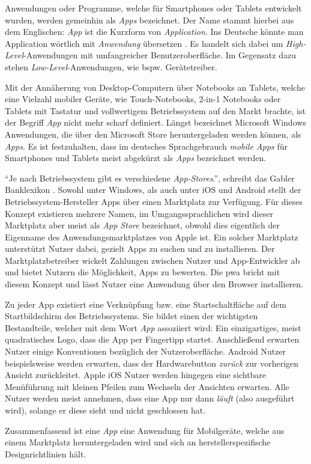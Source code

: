 Anwendungen oder Programme, welche für Smartphones oder Tablets entwickelt wurden, werden gemeinhin als \textit{Apps} bezeichnet. Der Name stammt hierbei aus dem Englischen: \textit{App} ist die Kurzform von \textit{Application}. Ins Deutsche könnte man Application wörtlich mit \textit{Anwendung} übersetzen \cite{BegriffApp}. Es handelt sich dabei um \textit{High-Level}-Anwendungen mit umfangreicher Benutzeroberfläche. Im Gegensatz dazu stehen \textit{Low-Level}-Anwendungen, wie bspw. Gerätetreiber.

Mit der Annäherung von Desktop-Computern über Notebooks an Tablets, welche eine Vielzahl mobiler Geräte, wie Touch-Notebooks, 2-in-1 Notebooks oder Tablets mit Tastatur und vollwertigem Betriebssystem auf den Markt brachte, ist der Begriff \textit{App} nicht mehr scharf definiert.
Längst bezeichnet Microsoft Windows Anwendungen, die über den Microsoft Store heruntergeladen werden können, als \textit{Apps}. Es ist festzuhalten, dass im deutsches Sprachgebrauch \textit{mobile Apps} für Smartphones und Tablets meist abgekürzt als \textit{Apps} bezeichnet werden.

"`Je nach Betriebssystem gibt es verschiedene \textit{App-Stores}."', schreibt das Gabler Banklexikon \cite{BegriffAppGabler}. Sowohl unter Windows, als auch unter iOS und Android stellt der Betriebssystem-Hersteller Apps über einen Marktplatz zur Verfügung. Für dieses Konzept existieren mehrere Namen, im Umgangssprachlichen wird dieser Marktplatz aber meist als \textit{App Store} bezeichnet, obwohl dies eigentlich der Eigenname des Anwendungsmarktplatzes von Apple ist. 
Ein solcher Marktplatz unterstützt Nutzer dabei, gezielt Apps zu suchen und zu installieren. Der Marktplatzbetreiber wickelt Zahlungen zwischen Nutzer und App-Entwickler ab und bietet Nutzern die Möglichkeit, Apps zu bewerten. 
Die \acf{pwa} bricht mit diesem Konzept und lässt Nutzer eine Anwendung über den Browser installieren. 

Zu jeder App existiert eine Verknüpfung bzw. eine Startschaltfläche auf dem Startbildschirm des Betriebssystems. Sie bildet einen der wichtigsten Bestandteile, welcher mit dem Wort \textit{App} assoziiert wird: Ein einzigartiges, meist quadratisches Logo, dass die App per Fingertipp startet. Anschließend erwarten Nutzer einige Konventionen bezüglich der Nutzeroberfläche. Android Nutzer beispielsweise werden erwarten, dass der Hardwarebutton \textit{zurück} zur vorherigen Ansicht zurückleitet. Apple iOS Nutzer werden hingegen eine sichtbare Menüführung mit kleinen Pfeilen zum Wechseln der Ansichten erwarten. Alle Nutzer werden meist annehmen, dass eine App nur dann \textit{läuft} (also ausgeführt wird), solange er diese sieht und nicht geschlossen hat.

Zusammenfassend ist eine \textit{App} eine Anwendung für Mobilgeräte, welche aus einem Marktplatz heruntergeladen wird und sich an herstellerspezifische Designrichtlinien hält.